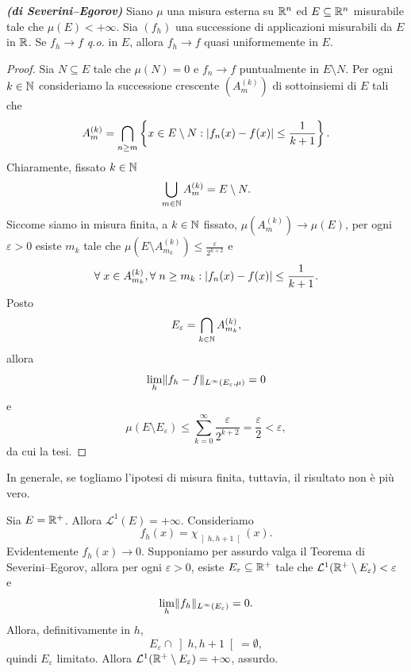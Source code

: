 \begin{teorema}\emph{\textbf{(di Severini--Egorov)}}
	Siano $\mu$ una misura esterna su $\mathbb{R}^n$ ed $E \subseteq \mathbb{R}^n$ misurabile tale che $\mu(E)< +\infty$. Sia $(f_{h})$ una successione di applicazioni misurabili da $E$ in $\mathbb{R}$. Se $f_{h} \to f$ \emph{q.o.} in $E$, allora $f_h \to f$ quasi uniformemente in $E$.
\end{teorema}
\begin{proof}
Sia $N \subseteq E$ tale che $\mu(N) = 0$ e $f_n \to f$ puntualmente in $E \setminus N$. Per ogni $k \in \mathbb{N}$ consideriamo la successione crescente $(A^{(k)}_m)$ di sottoinsiemi di $E$ tali che
\[ A^{(k)}_m = \bigcap_{n \ge m}\left\lbrace x \in E \setminus N: \lvert f_n(x)-f(x)\rvert\le \frac{1}{k+1}\right\rbrace.  \]
Chiaramente, fissato $k \in \mathbb{N}$
\[ \bigcup_{m \in \mathbb{N}} A^{(k)}_m = E \setminus N.\]
Siccome siamo in misura finita, a $k \in \mathbb{N}$ fissato, $\mu(A^{(k)}_m) \to \mu(E)$, per ogni $\varepsilon >0$ esiste $m_k$ tale che $\mu(E \setminus  A^{(k)}_{m_k}) \le \frac{\varepsilon}{2^{k+2}}$ e 
\[ \forall \; x \in  A^{(k)}_{m_k}, \forall \; n \ge m_k: \lvert f_n(x)-f(x)\rvert \le \frac{1}{k+1}.\]
Posto
\[ E_\varepsilon = \bigcap_{k \in \mathbb{N}} A^{(k)}_{m_k}, \]
allora 
\[ \lim_{h}\lVert f_{h}-f\rVert_{L^{\infty}(E_{\varepsilon},\mu)} =0 \]
e 
\[ \mu(E \setminus E_\varepsilon) \le \sum_{k=0}^{\infty}\frac{\varepsilon}{2^{k+2}} = \frac{\varepsilon}{2} <\varepsilon,\]
da cui la tesi.
\end{proof}
In generale, se togliamo l'ipotesi di misura finita, tuttavia, il risultato non è più vero.
\begin{esempio}
	Sia $E = \mathbb{R}^+$. Allora $\mathcal{L}^1(E) = +\infty$. Consideriamo 
	\[ f_h(x) = \chi_{\left] h,h+1\right[ }(x). \]
	Evidentemente $f_h(x) \to 0$. Supponiamo per assurdo valga il Teorema di Severini--Egorov, allora per ogni $\varepsilon > 0$, esiste $E_{\varepsilon} \subseteq \mathbb{R}^+$ tale che $\mathcal{L}^1(\mathbb{R}^+\setminus E_{\varepsilon}) < \varepsilon$ e 
	\[ \lim_{h} \lVert f_h\rVert_{L^{\infty}(E_{\varepsilon})} = 0. \]
	Allora, definitivamente in $h$, 
	\[ E_{\varepsilon} \cap \left] h,h+1\right[ = \emptyset, \]
	quindi $E_{\varepsilon}$ limitato. Allora $\mathcal{L}^1(\mathbb{R}^+\setminus E_{\varepsilon}) = +\infty$, assurdo.
\end{esempio}


